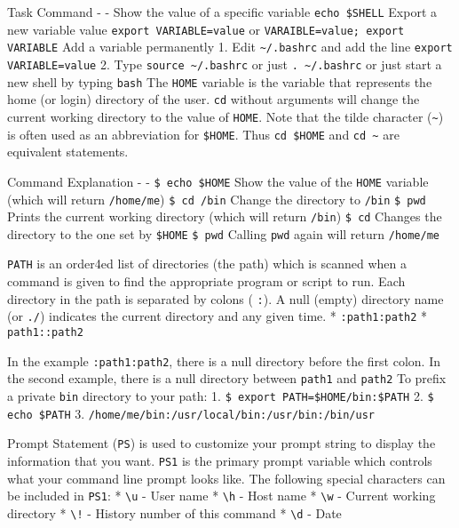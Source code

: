 Task \textbar{} Command - \textbar{} - Show the value of a specific
variable \textbar{} \texttt{echo \$SHELL} Export a new variable value
\textbar{} \texttt{export VARIABLE=value} or
\texttt{VARAIBLE=value; export VARIABLE} Add a variable permanently
\textbar{} 1. Edit \texttt{\textasciitilde{}/.bashrc} and add the line
\texttt{export VARIABLE=value} \textbar{} 2. Type
\texttt{source \textasciitilde{}/.bashrc} or just
\texttt{. \textasciitilde{}/.bashrc} or just start a new shell by typing
\texttt{bash} The \texttt{HOME} variable is the variable that represents
the home (or login) directory of the user. \texttt{cd} without arguments
will change the current working directory to the value of \texttt{HOME}.
Note that the tilde character (\texttt{\textasciitilde{}}) is often used
as an abbreviation for \texttt{\$HOME}. Thus \texttt{cd \$HOME} and
\texttt{cd \textasciitilde{}} are equivalent statements.

Command \textbar{} Explanation - \textbar{} - \texttt{\$ echo \$HOME}
\textbar{} Show the value of the \texttt{HOME} variable (which will
return \texttt{/home/me}) \texttt{\$ cd /bin} \textbar{} Change the
directory to \texttt{/bin} \texttt{\$ pwd} \textbar{} Prints the current
working directory (which will return \texttt{/bin}) \texttt{\$ cd}
\textbar{} Changes the directory to the one set by \texttt{\$HOME}
\texttt{\$ pwd} \textbar{} Calling \texttt{pwd} again will return
\texttt{/home/me}

\texttt{PATH} is an order4ed list of directories (the path) which is
scanned when a command is given to find the appropriate program or
script to run. Each directory in the path is separated by colons (
\texttt{:}). A null (empty) directory name (or \texttt{./}) indicates
the current directory and any given time. * \texttt{:path1:path2} *
\texttt{path1::path2}

In the example \texttt{:path1:path2}, there is a null directory before
the first colon. In the second example, there is a null directory
between \texttt{path1} and \texttt{path2} To prefix a private
\texttt{bin} directory to your path: 1.
\texttt{\$ export PATH=\$HOME/bin:\$PATH} 2. \texttt{\$ echo \$PATH} 3.
\texttt{/home/me/bin:/usr/local/bin:/usr/bin:/bin/usr}

Prompt Statement (\texttt{PS}) is used to customize your prompt string
to display the information that you want. \texttt{PS1} is the primary
prompt variable which controls what your command line prompt looks like.
The following special characters can be included in \texttt{PS1}: *
\texttt{\textbackslash{}u} - User name * \texttt{\textbackslash{}h} -
Host name * \texttt{\textbackslash{}w} - Current working directory *
\texttt{\textbackslash{}!} - History number of this command *
\texttt{\textbackslash{}d} - Date

